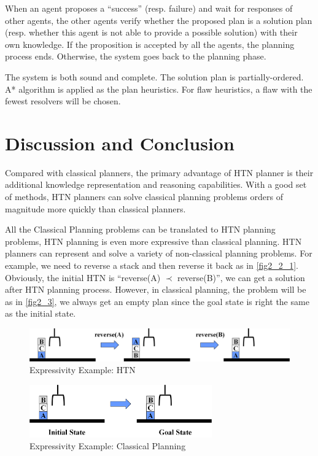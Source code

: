 When an agent proposes a “success” (resp. failure) and wait for responses of other agents, the other agents verify whether the proposed plan is a solution plan (resp. whether this agent is not able to provide a possible solution) with their own knowledge. If the proposition is accepted by all the agents, the planning process ends. Otherwise, the system goes back to the planning phase.

The system is both sound and complete. The solution plan is partially-ordered. A* algorithm is applied as the plan heuristics. For flaw heuristics, a flaw with the fewest resolvers will be chosen. 

\section{Discussion and Conclusion}
Compared with classical planners, the primary advantage of HTN planner is their additional knowledge representation and reasoning capabilities. With a good set of methods, HTN planners can solve classical planning problems orders of magnitude more quickly than classical planners. 

All the Classical Planning problems can be translated to HTN planning problems, HTN planning is even more expressive than classical planning. HTN planners can represent and solve a variety of non-classical planning problems. For example, we need to reverse a stack and then reverse it back as in \autoref{fig2_2_1}. Obviously, the initial HTN is “reverse(A) $\prec$ reverse(B)”, we can get a solution after HTN planning process. However, in classical planning, the problem will be as in \autoref{fig2_3}, we always get an empty plan since the goal state is right the same as the initial state.

\begin{figure}[H]
    \center
    \includegraphics[width=\textwidth]{./images/2_2_1.png}
    \caption{Expressivity Example: HTN}
    \label{fig2_2_1}
\end{figure}

\begin{figure}[H]
    \center
    \includegraphics[width=0.7\textwidth]{./images/2_3.png}
    \caption{Expressivity Example: Classical Planning}
    \label{fig2_3}
\end{figure}

